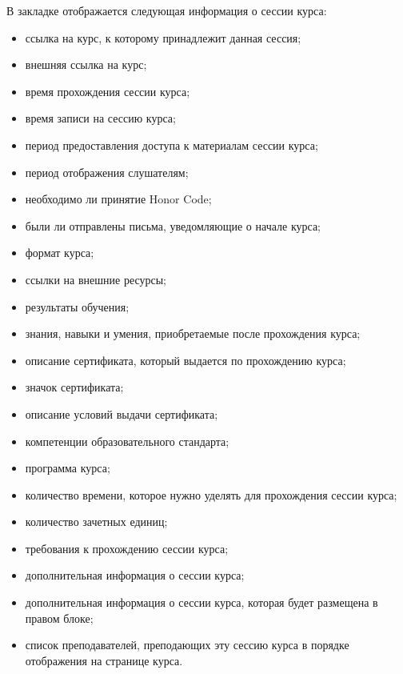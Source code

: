 	В закладке  отображается следующая информация о сессии курса:
	\begin{itemize}
		\item ссылка на курс, к которому принадлежит данная сессия;
		\item внешняя ссылка на курс;
		\item время прохождения сессии курса;
		\item время записи на сессию курса;
		\item период предоставления доступа к материалам сессии курса;
		\item период отображения слушателям;
		\item необходимо ли принятие Honor Code;
		\item были ли отправлены письма, уведомляющие о начале курса;
		\item формат курса;
		\item ссылки на внешние ресурсы;
		\item результаты обучения;
		\item знания, навыки и умения, приобретаемые после прохождения курса;
		\item описание сертификата, который выдается по прохождению курса;
		\item значок сертификата;
		\item описание условий выдачи сертификата;
		\item компетенции образовательного стандарта;
		\item программа курса;
		\item количество времени, которое нужно уделять для прохождения сессии курса;
		\item количество зачетных единиц;
		\item требования к прохождению сессии курса;
		\item дополнительная информация о сессии курса;
		\item дополнительная информация о сессии курса, которая будет размещена в правом блоке;
		\item список преподавателей, преподающих эту сессию курса в порядке отображения на странице курса. 
	\end{itemize}
	
